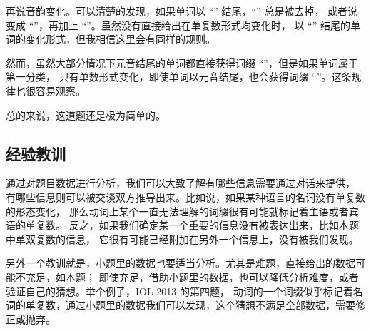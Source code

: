 再说音韵变化。可以清楚的发现，如果单词以 “” 结尾，“” 总是被去掉，
或者说变成 “”，再加上 “”。虽然没有直接给出在单复数形式均变化时，
以 “” 结尾的单词的变化形式，但我相信这里会有同样的规则。

然而，虽然大部分情况下元音结尾的单词都直接获得词缀 “”，但是如果单词属于第一分类，
只有单数形式变化，即使单词以元音结尾，也会获得词缀 “”。这条规律也很容易观察。

总的来说，这道题还是极为简单的。

\subsection{经验教训}

通过对题目数据进行分析，我们可以大致了解有哪些信息需要通过对话来提供，
有哪些信息则可以被交谈双方推导出来。比如说，如果某种语言的名词没有单复数的形态变化，
那么动词上某个一直无法理解的词缀很有可能就标记着主语或者宾语的单复数。
反之，如果我们确定某一个重要的信息没有被表达出来，比如本题中单双复数的信息，
它很有可能已经附加在另外一个信息上，没有被我们发现。

另外一个教训就是，小题里的数据也要适当分析。尤其是难题，直接给出的数据可能不充足，如本题；
即使充足，借助小题里的数据，也可以降低分析难度，或者验证自己的猜想。举个例子，IOL 2013 的第四题，
动词的一个词缀似乎标记着名词的单复数，通过小题里的数据我们可以发现，这个猜想不满足全部数据，需要修正或抛弃。
